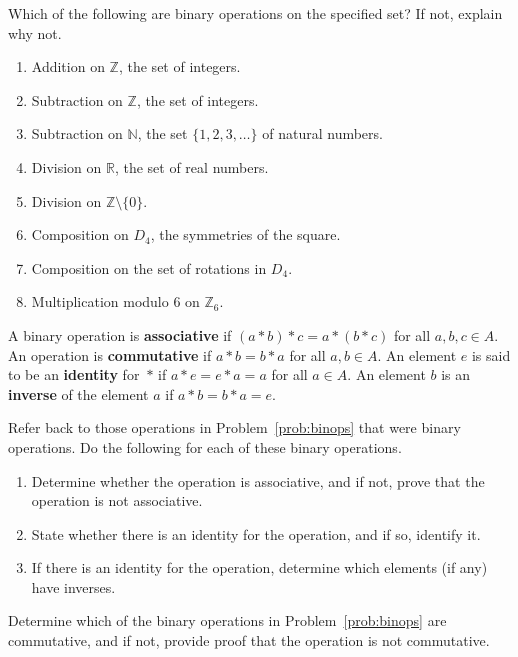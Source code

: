 \begin{problem}\label{prob:binops}
Which of the following are binary operations on the specified set? If not, explain why not.
\begin{enumerate}
  \item Addition on \(\mathbb{Z}\), the set of integers.
  \item Subtraction on \(\mathbb{Z}\), the set of integers.
  \item Subtraction on \(\mathbb{N}\), the set \(\{1,2,3,\ldots\}\) of natural numbers.
  \item Division on \(\mathbb{R}\), the set of real numbers.
  \item Division on \(\mathbb{Z}\setminus \{0\}\).
  \item Composition on \(D_4\), the symmetries of the square.
  \item Composition on the set of rotations in \(D_4\).
  \item Multiplication modulo 6 on \(\mathbb{Z}_6\).
\end{enumerate}
\end{problem}

\begin{definition}
A binary operation is \textbf{associative} if \((a * b)*c = a*(b*c)\) for all \(a,b,c \in A\). An operation is \textbf{commutative} if \(a * b = b * a\) for all \(a,b \in A\). An element \(e\) is said to be an \textbf{identity} for~\(*\) if \(a*e = e*a = a\) for all \(a \in A\).
An element \(b\) is an \textbf{inverse} of the element \(a\) if \(a * b = b * a = e\).
\end{definition}

\begin{problem}
Refer back to those operations in Problem~\ref{prob:binops} that were binary operations.
Do the following for each of these binary operations.
\begin{enumerate}
  \item Determine whether the operation is associative, and if not, prove that the operation is not associative.
  \item State whether there is an identity for the operation, and if so, identify it.
  \item If there is an identity for the operation, determine which elements (if any) have inverses.
\end{enumerate}
\end{problem}

\begin{problem}
Determine which of the binary operations in Problem~\ref{prob:binops} are commutative, and if not, provide proof that the operation is not commutative.
\end{problem}

